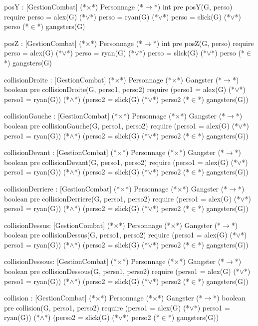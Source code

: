 \documentclass[a4paper, 11pt, notitlepage]{report}
\begin{document}
\begin{landscape}
\begin{Spe}
      posY : [GestionCombat] (*$\times$*) Personnage (*$\rightarrow$*) int 
	    pre posY(G, perso) require perso = alex(G) (*$\lor$*) perso = ryan(G) (*$\lor$*) perso = slick(G)  (*$\lor$*) perso (*$\in$*) gangsters(G)
	    
      posZ : [GestionCombat] (*$\times$*) Personnage (*$\rightarrow$*) int
	    pre posZ(G, perso) require perso = alex(G) (*$\lor$*) perso = ryan(G) (*$\lor$*) perso = slick(G)  (*$\lor$*) perso (*$\in$*) gangsters(G)
	    
      collisionDroite : [GestionCombat] (*$\times$*) Personnage (*$\times$*) Gangster (*$\rightarrow$*) boolean
	    pre collisionDroite(G, perso1, perso2) require 
	    (perso1 = alex(G) (*$\lor$*) perso1 = ryan(G)) (*$\land$*) (perso2 = slick(G) (*$\lor$*) perso2 (*$\in$*) gangsters(G))
	    
      collisionGauche : [GestionCombat] (*$\times$*) Personnage (*$\times$*) Gangster (*$\rightarrow$*) boolean
	    pre collisionGauche(G, perso1, perso2) require 
	    (perso1 = alex(G) (*$\lor$*) perso1 = ryan(G)) (*$\land$*) (perso2 = slick(G) (*$\lor$*) perso2 (*$\in$*) gangsters(G))
	    
      collisionDevant : [GestionCombat] (*$\times$*) Personnage (*$\times$*) Gangster (*$\rightarrow$*) boolean
	    pre collisionDevant(G, perso1, perso2) require 
	    (perso1 = alex(G) (*$\lor$*) perso1 = ryan(G)) (*$\land$*) (perso2 = slick(G) (*$\lor$*) perso2 (*$\in$*) gangsters(G))
	    
      collisionDerriere : [GestionCombat] (*$\times$*) Personnage (*$\times$*) Gangster (*$\rightarrow$*) boolean
	    pre collisionDerriere(G, perso1, perso2) require 
	    (perso1 = alex(G) (*$\lor$*) perso1 = ryan(G)) (*$\land$*) (perso2 = slick(G) (*$\lor$*) perso2 (*$\in$*) gangsters(G))
	    
      collisionDessus: [GestionCombat] (*$\times$*) Personnage (*$\times$*) Gangster (*$\rightarrow$*) boolean
	    pre collisionDessus(G, perso1, perso2) require 
	    (perso1 = alex(G) (*$\lor$*) perso1 = ryan(G)) (*$\land$*) (perso2 = slick(G) (*$\lor$*) perso2 (*$\in$*) gangsters(G))
	    
      collisionDessous: [GestionCombat] (*$\times$*) Personnage (*$\times$*) Gangster (*$\rightarrow$*) boolean
	    pre collisionDessous(G, perso1, perso2) require 
	    (perso1 = alex(G) (*$\lor$*) perso1 = ryan(G)) (*$\land$*) (perso2 = slick(G) (*$\lor$*) perso2 (*$\in$*) gangsters(G))
	    
      collision : [GestionCombat] (*$\times$*) Personnage (*$\times$*) Gangster (*$\rightarrow$*) boolean
	    pre collision(G, perso1, perso2) require 
	    (perso1 = alex(G) (*$\lor$*) perso1 = ryan(G)) (*$\land$*) (perso2 = slick(G) (*$\lor$*) perso2 (*$\in$*) gangsters(G))


\end{Spe}
\end{landscape}
\end{document}
